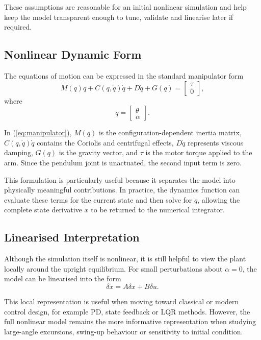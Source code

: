 \documentclass[conference]{IEEEtran}
\begin{document}
These assumptions are reasonable for an initial nonlinear simulation and help keep the model transparent enough to tune, validate and linearise later if required.

\subsection{Nonlinear Dynamic Form}
The equations of motion can be expressed in the standard manipulator form
\begin{equation}
M(q)\ddot{q} + C(q,\dot{q})\dot{q} + D\dot{q} + G(q) =
\begin{bmatrix}
\tau \\
0
\end{bmatrix},
\label{eq:manipulator}
\end{equation}
where
\begin{equation}
q =
\begin{bmatrix}
\theta \\
\alpha
\end{bmatrix}.
\end{equation}

In (\ref{eq:manipulator}), $M(q)$ is the configuration-dependent inertia matrix, $C(q,\dot{q})\dot{q}$ contains the Coriolis and centrifugal effects, $D\dot{q}$ represents viscous damping, $G(q)$ is the gravity vector, and $\tau$ is the motor torque applied to the arm. Since the pendulum joint is unactuated, the second input term is zero.

This formulation is particularly useful because it separates the model into physically meaningful contributions. In practice, the dynamics function can evaluate these terms for the current state and then solve for $\ddot{q}$, allowing the complete state derivative $\dot{x}$ to be returned to the numerical integrator.

\subsection{Linearised Interpretation}
Although the simulation itself is nonlinear, it is still helpful to view the plant locally around the upright equilibrium. For small perturbations about $\alpha = 0$, the model can be linearised into the form
\begin{equation}
\delta\dot{x} = A\delta x + B\delta u.
\end{equation}

This local representation is useful when moving toward classical or modern control design, for example PD, state feedback or LQR methods. However, the full nonlinear model remains the more informative representation when studying large-angle excursions, swing-up behaviour or sensitivity to initial condition.
\end{document}
